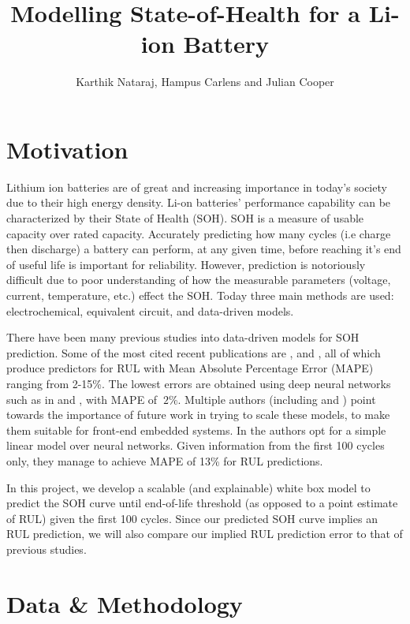 \documentclass{article}
\title{Modelling State-of-Health for a Li-ion Battery}
\author{Karthik Nataraj, Hampus Carlens and Julian Cooper}
\begin{document}
\maketitle

\section{Motivation}
Lithium ion batteries are of great and increasing importance in today's society due to their high energy density.  Li-on batteries' performance capability can be characterized by their State of Health (SOH). SOH is a measure of usable capacity over rated capacity. Accurately predicting how many cycles (i.e charge then discharge) a battery can perform, at any given time, before reaching it’s end of useful life is important for reliability. However, prediction is notoriously difficult due to poor understanding of how the measurable parameters (voltage, current, temperature, etc.) effect the SOH. Today three main methods are used: electrochemical, equivalent circuit, and data-driven models.

There have been many previous studies into data-driven models for SOH prediction. Some of the most cited recent publications are \cite{severson2019data}, \cite{roman2021machine} and \cite{energiesMdpi}, all of which produce predictors for RUL with Mean Absolute Percentage Error (MAPE) ranging from 2-15\%.  The lowest errors are obtained using deep neural networks such as in \cite{roman2021machine} and \cite{energiesMdpi}, with MAPE of $~ 2\%$. Multiple authors (including \cite{energiesMdpi} and \cite{DariusOld}) point towards the importance of future work in trying to scale these models, to make them suitable for front-end embedded systems. In \cite{severson2019data} the authors opt for a simple linear model over neural networks. Given information from the first 100 cycles only, they manage to achieve MAPE of 13\% for RUL predictions. 

In this project, we develop a scalable (and explainable) white box model to predict the SOH curve until end-of-life threshold (as opposed to a point estimate of RUL) given the first 100 cycles. Since our predicted SOH curve implies an RUL prediction, we will also compare our implied RUL prediction error to that of previous studies.


\section{Data \& Methodology}
\end{document}
